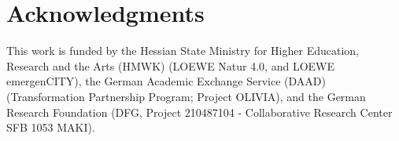 \section*{Acknowledgments}
This work is funded by the Hessian State Ministry for Higher Education, Research and the Arts (HMWK) (LOEWE Natur 4.0, and LOEWE emergenCITY), the German Academic Exchange Service (DAAD) (Transformation Partnership Program; Project OLIVIA), and the German Research Foundation (DFG, Project 210487104 - Collaborative Research Center SFB 1053 MAKI).
